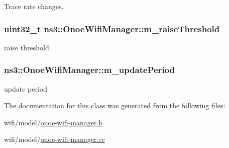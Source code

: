 Trace rate changes. 

\subsubsection[{\texorpdfstring{m\+\_\+raise\+Threshold}{m_raiseThreshold}}]{\setlength{\rightskip}{0pt plus 5cm}uint32\+\_\+t ns3\+::\+Onoe\+Wifi\+Manager\+::m\+\_\+raise\+Threshold\hspace{0.3cm}{\ttfamily [private]}}\hypertarget{classns3_1_1OnoeWifiManager_abd4f1bac1a93e084879e39100096d8cf}{}\label{classns3_1_1OnoeWifiManager_abd4f1bac1a93e084879e39100096d8cf}


raise threshold 

\subsubsection[{\texorpdfstring{m\+\_\+update\+Period}{m_updatePeriod}}]{ ns3\+::\+Onoe\+Wifi\+Manager\+::m\+\_\+update\+Period\hspace{0.3cm}{\ttfamily [private]}}\hypertarget{classns3_1_1OnoeWifiManager_a43506e7013f037ec858df5af2de2f1cb}{}\label{classns3_1_1OnoeWifiManager_a43506e7013f037ec858df5af2de2f1cb}


update period 



The documentation for this class was generated from the following files\+:\begin{DoxyCompactItemize}
\item 
wifi/model/\hyperlink{onoe-wifi-manager_8h}{onoe-\/wifi-\/manager.\+h}\item 
wifi/model/\hyperlink{onoe-wifi-manager_8cc}{onoe-\/wifi-\/manager.\+cc}\end{DoxyCompactItemize}
